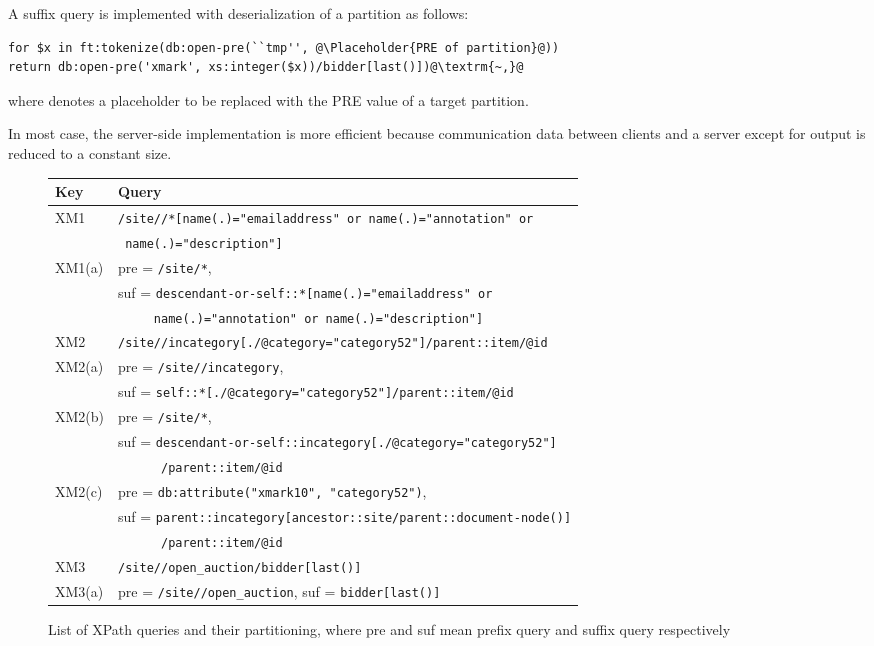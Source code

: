 A suffix query is implemented with deserialization of a partition as follows:
\begin{lstlisting}[escapechar=\@]
for $x in ft:tokenize(db:open-pre(``tmp'', @\Placeholder{PRE of partition}@))
return db:open-pre('xmark', xs:integer($x))/bidder[last()])@\textrm{~,}@
\end{lstlisting}
where  denotes a placeholder to be replaced with
the PRE value of a target partition.

In most case, the server-side implementation is more efficient because communication data
between clients and a server except for output is reduced to a constant size.


\begin{figure}[tbp]
	\centering
	\caption{List of XPath queries and their partitioning, where pre and suf
		mean prefix query and suffix query respectively}
	\label{tab:dpsqueries}
	\small
	\begin{tabular}{l|l}
		\hline
		Key & Query \\
		\hline
		XM1  & \verb|/site//*[name(.)="emailaddress" or name(.)="annotation" or| \\
		& \verb| name(.)="description"] |\\
		XM1(a) & pre = \verb|/site/*|, \\
		& suf = \verb|descendant-or-self::*[name(.)="emailaddress" or | \\
		& \verb|     name(.)="annotation" or name(.)="description"]| \\
		\hline
		XM2 & \verb|/site//incategory[./@category="category52"]/parent::item/@id| \\
		XM2(a) & pre = \verb|/site//incategory|, \quad \\
		& suf = \verb|self::*[./@category="category52"]/parent::item/@id| \\
		XM2(b) & pre = \verb|/site/*|, \quad  \\
		& suf = \verb|descendant-or-self::incategory[./@category="category52"]|\\
		& \verb|      /parent::item/@id| \\
		XM2(c) & pre = \verb|db:attribute("xmark10", "category52")|, \\
		& suf = \verb|parent::incategory[ancestor::site/parent::document-node()]| \\
		& \verb|      /parent::item/@id| \\
		\hline
		XM3 & \verb|/site//open_auction/bidder[last()]| \\
		XM3(a) & pre = \verb|/site//open_auction|, \quad suf = \verb|bidder[last()]| \\

\end{tabular}
\end{figure}
